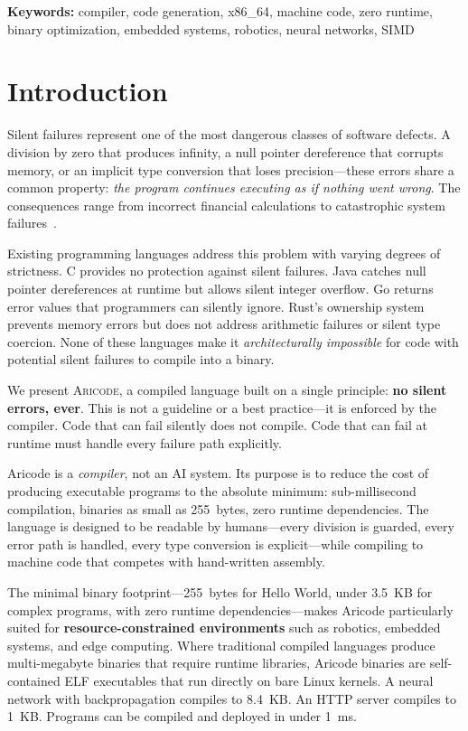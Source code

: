 \documentclass[11pt,a4paper]{article}
\begin{document}
\textbf{Keywords:} compiler, code generation, x86\_64, machine code, zero runtime, binary optimization, embedded systems, robotics, neural networks, SIMD

\section{Introduction}
\label{sec:intro}

Silent failures represent one of the most dangerous classes of software defects. A division by zero that produces infinity, a null pointer dereference that corrupts memory, or an implicit type conversion that loses precision---these errors share a common property: \emph{the program continues executing as if nothing went wrong}. The consequences range from incorrect financial calculations to catastrophic system failures~\cite{ariane5,toyota2013}.

Existing programming languages address this problem with varying degrees of strictness. C provides no protection against silent failures. Java catches null pointer dereferences at runtime but allows silent integer overflow. Go returns error values that programmers can silently ignore. Rust's ownership system prevents memory errors but does not address arithmetic failures or silent type coercion. None of these languages make it \emph{architecturally impossible} for code with potential silent failures to compile into a binary.

We present \textsc{Aricode}, a compiled language built on a single principle: \textbf{no silent errors, ever}. This is not a guideline or a best practice---it is enforced by the compiler. Code that can fail silently does not compile. Code that can fail at runtime must handle every failure path explicitly.

Aricode is a \emph{compiler}, not an AI system. Its purpose is to reduce the cost of producing executable programs to the absolute minimum: sub-millisecond compilation, binaries as small as 255~bytes, zero runtime dependencies. The language is designed to be readable by humans---every division is guarded, every error path is handled, every type conversion is explicit---while compiling to machine code that competes with hand-written assembly.

The minimal binary footprint---255~bytes for Hello World, under 3.5~KB for complex programs, with zero runtime dependencies---makes Aricode particularly suited for \textbf{resource-constrained environments} such as robotics, embedded systems, and edge computing. Where traditional compiled languages produce multi-megabyte binaries that require runtime libraries, Aricode binaries are self-contained ELF executables that run directly on bare Linux kernels. A neural network with backpropagation compiles to 8.4~KB. An HTTP server compiles to 1~KB. Programs can be compiled and deployed in under 1~ms.
\end{document}
